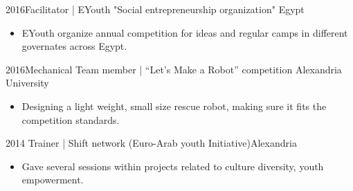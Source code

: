 \begin{extras}

  \extra
    {2016}{Facilitator |  EYouth "Social entrepreneurship organization" }{Egypt}
      {
                      \begin{itemize}
                         \item EYouth organize annual competition for ideas and regular camps in different governates across Egypt.
                      \end{itemize}
                    }
\extra
    {2016}{Mechanical Team member | “Let’s Make a Robot” competition }{Alexandria University}
      {
                      \begin{itemize}
                         \item Designing a light weight, small size  rescue robot, making sure it fits the competition standards.
                      \end{itemize}
                    }
    \extra
    {2014} {Trainer | Shift network (Euro-Arab youth Initiative)}{Alexandria}
           {
                      \begin{itemize}
                        \item Gave several sessions within projects related to culture diversity, youth empowerment.
                      \end{itemize}
                    }
\end{extras}
